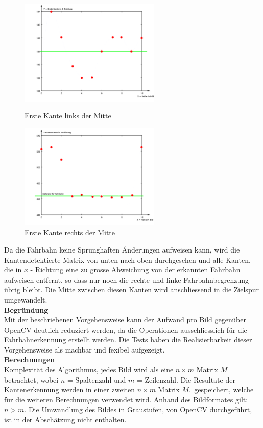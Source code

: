 \begin{figure}[ht!]
\centering
\includegraphics[width=0.6\textwidth]{03_Loesungskonzept/pictures/minEdge.png}
\caption{Erste Kante links der Mitte}
\includegraphics[width=0.6\textwidth]{03_Loesungskonzept/pictures/maxEdge.png}
\caption{Erste Kante rechts der Mitte}
\label{fig:kanten}
\end{figure}
Da die Fahrbahn keine Sprunghaften Änderungen aufweisen kann, wird die Kantendetektierte Matrix von unten nach oben durchgesehen und alle Kanten, die in $x$ - Richtung eine zu grosse Abweichung von der erkannten Fahrbahn aufweisen entfernt, so dass nur noch die rechte und linke Fahrbahnbegrenzung übrig bleibt. Die Mitte zwischen diesen Kanten wird anschliessend in die Zielspur umgewandelt.\\[0.2cm]
\textbf{Begründung}\\[0.2cm]
Mit der beschriebenen Vorgehensweise kann der Aufwand pro Bild gegenüber OpenCV deutlich reduziert werden, da die Operationen ausschliesslich für die Fahrbahnerkennung erstellt werden. Die Tests haben die Realisierbarkeit dieser Vorgehensweise als machbar und fexibel aufgezeigt.\\[0.2cm]
\textbf{Berechnungen}\\[0.2cm]
Komplexität des Algorithmus, jedes Bild wird als eine $n\times{m}$ Matrix $M$ betrachtet, wobei $n$ = Spaltenzahl und $m$ = Zeilenzahl. Die Resultate der Kantenerkennung werden in einer zweiten $n\times{m}$ Matrix $M_1$ gespeichert, welche für die weiteren Berechnungen verwendet wird. Anhand des Bildformates gilt: $n>m$. Die Umwandlung des Bildes in Graustufen, von OpenCV durchgeführt, ist in der Abschätzung nicht enthalten.
